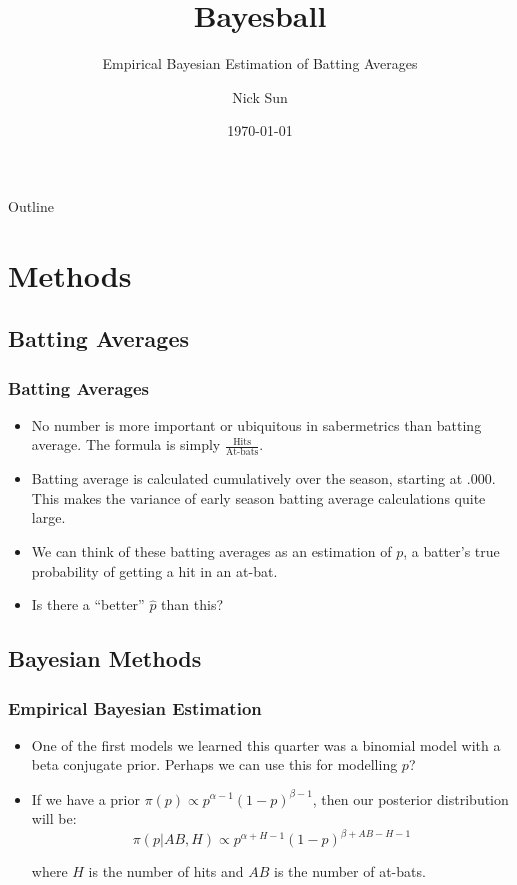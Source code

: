 \documentclass{beamer}
\title{Bayesball}
\subtitle{Empirical Bayesian Estimation of Batting Averages}
\author{Nick Sun}
\institute{Oregon State University}
\date{\today}
\begin{document}
\begin{frame}
\titlepage
\end{frame}

\begin{frame}{Outline}
	\tableofcontents
\end{frame}

\section{Methods}
\subsection{Batting Averages}
\begin{frame}
\frametitle{Batting Averages}
\begin{itemize}
	\item No number is more important or ubiquitous in sabermetrics than batting average. The formula is simply $\frac{\text{Hits}}{\text{At-bats}}$.
	\item Batting average is  calculated cumulatively over the season, starting at .000.
		This makes the variance of early season batting average calculations quite large.
	\item We can think of these batting averages as an estimation of $p$, a batter's true probability of getting a hit in an at-bat.
	\item Is there a ``better'' $\hat{p}$ than this?
\end{itemize}
\end{frame}

\subsection{Bayesian Methods}
\begin{frame}
	\frametitle{Empirical Bayesian Estimation}
	\begin{itemize}
		\item One of the first models we learned this quarter was a binomial model with a beta conjugate prior. Perhaps we can use this for modelling $p$?
		\item If we have a prior $\pi(p) \propto p^{\alpha-1} (1 -p)^{\beta-1}$, then our posterior distribution will be:
			$$\pi(p | AB, H) \propto p^{\alpha + H - 1} (1 - p)^{\beta + AB - H - 1}$$

			where $H$ is the number of hits and $AB$ is the number of at-bats.
	\end{itemize}
\end{frame}
\end{document}

